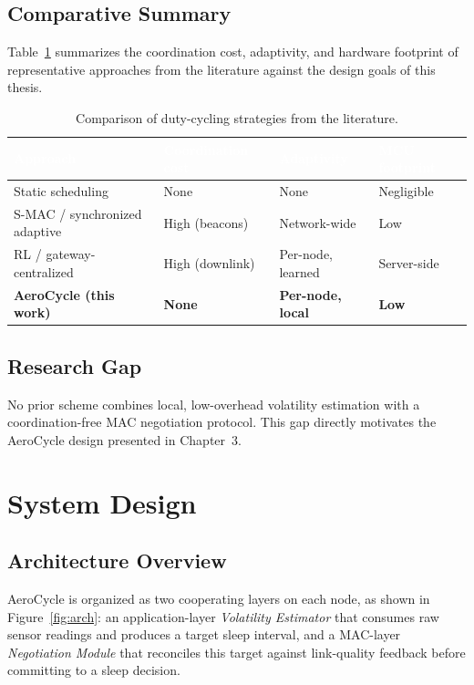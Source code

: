 \documentclass[12pt,a4paper]{report}
\begin{document}
\section{Comparative Summary}
Table~\ref{tab:comparison} summarizes the coordination cost, adaptivity, and hardware
footprint of representative approaches from the literature against the design goals of this
thesis.

\begin{table}[H]
\centering
\caption{Comparison of duty-cycling strategies from the literature.}
\label{tab:comparison}
\begin{tabularx}{\textwidth}{@{}lXXX@{}}
\toprule
\rowcolor{nustgreen}
\textcolor{white}{\bfseries Approach} & \textcolor{white}{\bfseries Coordination cost} &
\textcolor{white}{\bfseries Adaptivity} & \textcolor{white}{\bfseries MCU footprint} \\
\midrule
Static scheduling            & None            & None            & Negligible \\
\rowcolor{nustmist}
S-MAC / synchronized adaptive & High (beacons)  & Network-wide     & Low \\
RL / gateway-centralized      & High (downlink) & Per-node, learned & Server-side \\
\rowcolor{nustmist}
\textbf{AeroCycle (this work)} & \textbf{None}   & \textbf{Per-node, local} & \textbf{Low} \\
\bottomrule
\end{tabularx}
\end{table}

\section{Research Gap}
No prior scheme combines local, low-overhead volatility estimation with a coordination-free
MAC negotiation protocol. This gap directly motivates the AeroCycle design presented in
Chapter~3.

\chapter{System Design}
\label{ch:design}

\section{Architecture Overview}
AeroCycle is organized as two cooperating layers on each node, as shown in
Figure~\ref{fig:arch}: an application-layer \emph{Volatility Estimator} that consumes raw
sensor readings and produces a target sleep interval, and a MAC-layer \emph{Negotiation
Module} that reconciles this target against link-quality feedback before committing to a
sleep decision.
\end{document}
